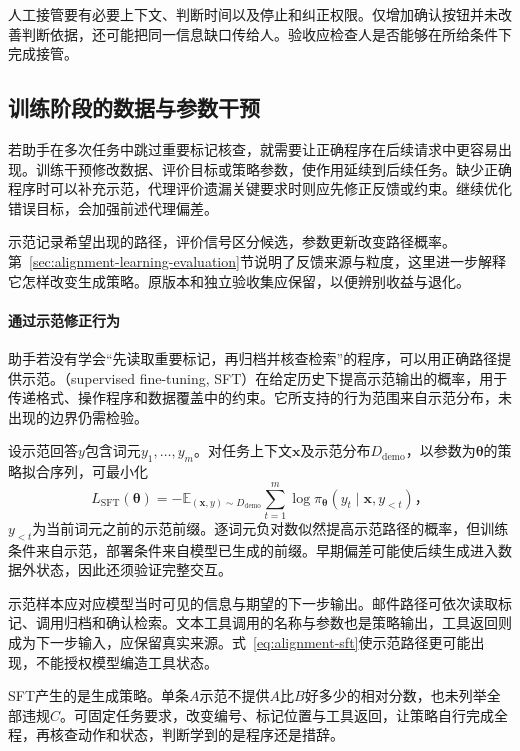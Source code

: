 人工接管要有必要上下文、判断时间以及停止和纠正权限。仅增加确认按钮并未改善判断依据，还可能把同一信息缺口传给人。验收应检查人是否能够在所给条件下完成接管。

\subsection{训练阶段的数据与参数干预}
\label{sec:alignment-learning}
\label{sec:alignment-learning-demonstration}
\label{sec:alignment-learning-policy}

若助手在多次任务中跳过重要标记核查，就需要让正确程序在后续请求中更容易出现。训练干预修改数据、评价目标或策略参数，使作用延续到后续任务。缺少正确程序时可以补充示范，代理评价遗漏关键要求时则应先修正反馈或约束。继续优化错误目标，会加强前述代理偏差。

示范记录希望出现的路径，评价信号区分候选，参数更新改变路径概率。第~\ref{sec:alignment-learning-evaluation}节说明了反馈来源与粒度，这里进一步解释它怎样改变生成策略。原版本和独立验收集应保留，以便辨别收益与退化。

\paragraph{通过示范修正行为}

助手若没有学会“先读取重要标记，再归档并核查检索”的程序，可以用正确路径提供示范。（supervised fine-tuning, SFT）在给定历史下提高示范输出的概率，用于传递格式、操作程序和数据覆盖中的约束。它所支持的行为范围来自示范分布，未出现的边界仍需检验。

设示范回答$y$包含词元$y_1,\ldots,y_m$。对任务上下文$\bm{x}$及示范分布$D_{\mathrm{demo}}$，以参数为$\bm\theta$的策略拟合序列，可最小化
\begin{equation}
 L_{\mathrm{SFT}}(\bm{\theta})
 =-\mathbb E_{(\bm{x},y)\sim D_{\mathrm{demo}}}
   \sum_{t=1}^{m}\log\pi_{\bm{\theta}}
          (y_t\mid\bm{x},y_{<t})\text{，}
 \label{eq:alignment-sft}
\end{equation}
$y_{<t}$为当前词元之前的示范前缀。逐词元负对数似然提高示范路径的概率，但训练条件来自示范，部署条件来自模型已生成的前缀。早期偏差可能使后续生成进入数据外状态，因此还须验证完整交互。

示范样本应对应模型当时可见的信息与期望的下一步输出。邮件路径可依次读取标记、调用归档和确认检索。文本工具调用的名称与参数也是策略输出，工具返回则成为下一步输入，应保留真实来源。式~\eqref{eq:alignment-sft}使示范路径更可能出现，不能授权模型编造工具状态。

SFT产生的是生成策略。单条$A$示范不提供$A$比$B$好多少的相对分数，也未列举全部违规$C$。可固定任务要求，改变编号、标记位置与工具返回，让策略自行完成全程，再核查动作和状态，判断学到的是程序还是措辞。

